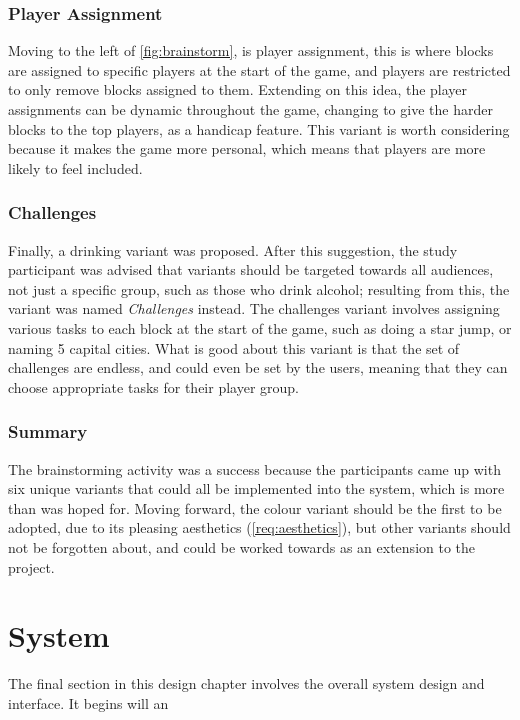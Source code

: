 \subsubsection{Player Assignment}
Moving to the left of \cref{fig:brainstorm}, is player assignment, this is where blocks are assigned to specific players at the start of the game, and players are restricted to only remove blocks assigned to them. Extending on this idea, the player assignments can be dynamic throughout the game, changing to give the harder blocks to the top players, as a handicap feature. This variant is worth considering because it makes the game more personal, which means that players are more likely to feel included.

\subsubsection{Challenges}
Finally, a drinking variant was proposed. After this suggestion, the study participant was advised that variants should be targeted towards all audiences, not just a specific group, such as those who drink alcohol; resulting from this, the variant was named \textit{Challenges} instead. The challenges variant involves assigning various tasks to each block at the start of the game, such as doing a star jump, or naming 5 capital cities. What is good about this variant is that the set of challenges are endless, and could even be set by the users, meaning that they can choose appropriate tasks for their player group.

\subsubsection{Summary}\label{sec:variantssummary}
The brainstorming activity was a success because the participants came up with six unique variants that could all be implemented into the system, which is more than was hoped for. Moving forward, the colour variant should be the first to be adopted, due to its pleasing aesthetics (\cref{req:aesthetics}), but other variants should not be forgotten about, and could be worked towards as an extension to the project.

\section{System}

The final section in this design chapter involves the overall system design and interface. It begins will an 

